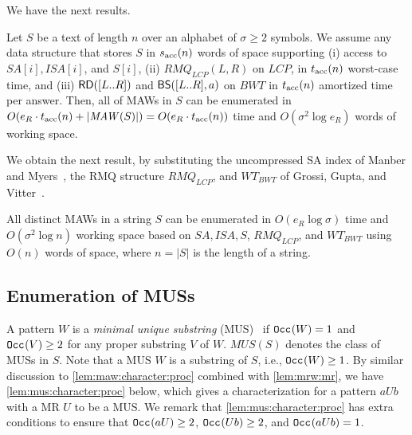 We have the next results.

\begin{theorem}\label{thm:algo:main}
  Let $S$ be a text of length $n$ over an alphabet of $\sigma\ge 2$ symbols.
  We assume any data structure that stores $S$ in $s_{\mathrm{acc}}(n)$ words of space supporting
  (i) access to $SA[i], ISA[i]$, and $S[i]$, 
  (ii) $RMQ_{LCP}(L, R)$ on $LCP$, 
  in $t_{\mathrm{acc}}(n)$ worst-case time, and 
  (iii) $\mbox{\textsf{RD}}([L..R])$ and $\mbox{\textsf{BS}}([L..R], a)$ on $BWT$ 
  in $t_{\mathrm{acc}}(n)$ amortized time per answer. 
  Then, all of MAWs in $S$ can be enumerated
  in $O(e_R\cdot t_\fn{acc}(n) + |\MAW(S)|) = O(e_R\cdot t_\fn{acc}(n))$ time and
  $O(\sigma^2 \log e_R)$ words of working space. 
\end{theorem}

We obtain the next result, by substituting the uncompressed SA index of Manber and Myers~\cite{manber:myers1993suffixarrays}, the RMQ structure $RMQ_{LCP}$, and $WT_{BWT}$ of Grossi, Gupta, and Vitter~\cite{grossi2003high}.  

\begin{theorem}\label{thm:algo:uncompressed:sa}
  All distinct MAWs in a string $S$ can be enumerated in $O(e_R \log\sigma)$ time and $O(\sigma^2 \log n)$ working space based on $SA, ISA, S$, $RMQ_{LCP}$, and $WT_{BWT}$ using $O(n)$ words of space,
  where $n = |S|$ is the length of a string. 
\end{theorem}


\subsection{Enumeration of MUSs}
\label{secsub:mrw}

A pattern $W$ is a \textit{minimal unique substring} (MUS)~\cite{ilie2011minimum} if $\mathtt{Occ}_{}(W) = 1$ and $\mathtt{Occ}_{}(V)\ge 2$ for any proper substring $V$ of $W$. $MUS(S)$ denotes the class of MUSs in $S$. Note that a MUS $W$ is a substring of $S$, i.e., $\mathtt{Occ}_{}(W)\ge 1$. 
By similar discussion to \cref{lem:maw:character:proc} combined with \cref{lem:mrw:mr}, we have \cref{lem:mus:character:proc} below, which gives a characterization for a pattern $a U b$ with a MR $U$ to be a MUS. 
We remark that \cref{lem:mus:character:proc} has extra conditions to ensure that $\mathtt{Occ}_{}(aU) \ge 2$, $\mathtt{Occ}_{}(Ub) \ge 2$, and $\mathtt{Occ}_{}(aUb) = 1$. 



